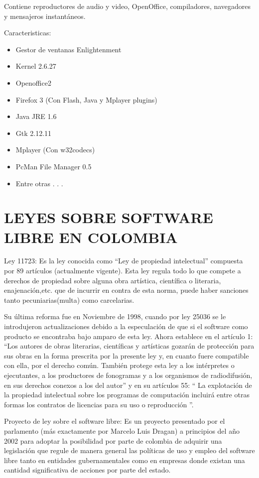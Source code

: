 Contiene reproductores de audio y video, OpenOffice,
compiladores, navegadores y mensajeros instantáneos.

Caracteristicas:

\begin{itemize}
  \item Gestor de ventanas Enlightenment
  \item Kernel 2.6.27
  \item Openoffice2
  \item Firefox 3 (Con Flash, Java y Mplayer plugins)
  \item Java JRE 1.6
  \item Gtk 2.12.11
  \item Mplayer (Con w32codecs)
  \item PcMan File Manager 0.5
  \item Entre otras . . .
\end{itemize}

\section*{LEYES SOBRE SOFTWARE LIBRE EN COLOMBIA}

Ley 11723: Es la ley conocida como “Ley de propiedad
intelectual” compuesta por 89 artículos (actualmente vigente).
Esta ley regula todo lo que compete a derechos de propiedad
sobre alguna obra artística, científica o literaria,
enajenación,etc. que de incurrir en contra de esta norma, puede
haber sanciones tanto pecuniarias(multa) como carcelarias.

Su última reforma fue en Noviembre de 1998, cuando por ley
25036 se le introdujeron actualizaciones debido a la
especulación de que si el software como producto se encontraba
bajo amparo de esta ley. Ahora establece en el artículo 1: “Los
autores de obras literarias, científicas y artísticas gozarán de
protección para sus obras en la forma prescrita por la presente
ley y, en cuanto fuere compatible con ella, por el derecho común.
También protege esta ley a los intérpretes o ejecutantes, a los
productores de fonogramas y a los organismos de radiodifusión,
en sus derechos conexos a los del autor” y en su artículos 55: “
La explotación de la propiedad intelectual sobre los programas
de computación incluirá entre otras formas los contratos de
licencias para su uso o reproducción ”.

Proyecto de ley sobre el software libre: Es un proyecto
presentado por el parlamento (más exactamente por Marcelo
Luis Dragan) a principios del año 2002 para adoptar la
posibilidad por parte de colombia de adquirir una legislación
que regule de manera general las políticas de uso y empleo del
software libre tanto en entidades gubernamentales como en
empresas donde existan una cantidad significativa de acciones
por parte del estado.

